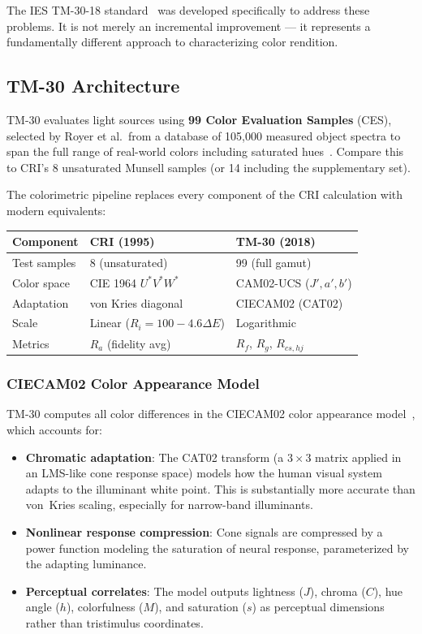 \documentclass[11pt]{article}
\begin{document}
The IES TM-30-18 standard~\cite{tm30} was developed specifically to
address these problems.  It is not merely an incremental improvement ---
it represents a fundamentally different approach to characterizing color
rendition.

\subsection{TM-30 Architecture}

TM-30 evaluates light sources using \textbf{99 Color Evaluation Samples}
(CES), selected by Royer et al.\ from a database of 105,000 measured
object spectra to span the full range of real-world colors including
saturated hues~\cite{royer2012}.  Compare this to CRI's 8 unsaturated
Munsell samples (or 14 including the supplementary set).

The colorimetric pipeline replaces every component of the CRI calculation
with modern equivalents:

\begin{center}
\begin{tabular}{lll}
\toprule
\textbf{Component} & \textbf{CRI (1995)} & \textbf{TM-30 (2018)} \\
\midrule
Test samples   & 8 (unsaturated)        & 99 (full gamut) \\
Color space    & CIE 1964 $U^*V^*W^*$   & CAM02-UCS ($J', a', b'$) \\
Adaptation     & von Kries diagonal      & CIECAM02 (CAT02) \\
Scale          & Linear ($R_i = 100 - 4.6\Delta E$) & Logarithmic \\
Metrics        & $R_a$ (fidelity avg)    & $R_f$, $R_g$, $R_{cs,hj}$ \\
\bottomrule
\end{tabular}
\end{center}

\subsubsection{CIECAM02 Color Appearance Model}

TM-30 computes all color differences in the CIECAM02 color appearance
model~\cite{ciecam02}, which accounts for:
\begin{itemize}
\item \textbf{Chromatic adaptation}: The CAT02 transform (a $3\times 3$
  matrix applied in an LMS-like cone response space) models how the human
  visual system adapts to the illuminant white point.  This is
  substantially more accurate than von~Kries scaling, especially for
  narrow-band illuminants.
\item \textbf{Nonlinear response compression}: Cone signals are
  compressed by a power function modeling the saturation of neural
  response, parameterized by the adapting luminance.
\item \textbf{Perceptual correlates}: The model outputs lightness ($J$),
  chroma ($C$), hue angle ($h$), colorfulness ($M$), and saturation ($s$)
  as perceptual dimensions rather than tristimulus coordinates.
\end{itemize}
\end{document}
